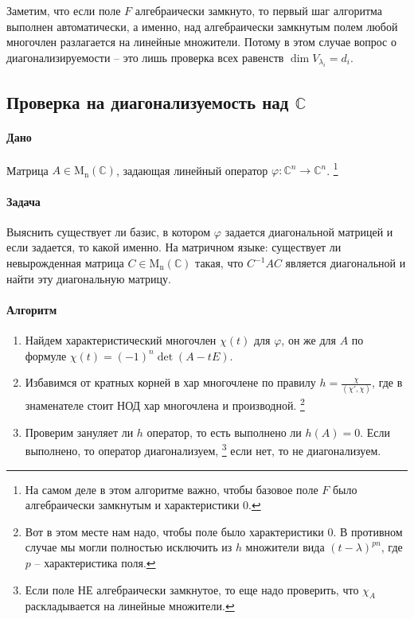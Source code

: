 \documentclass{article}
\newcommand{\Matrix}[2]{\operatorname{\mathrm{M}_{#2}}(#1)}
\begin{document}
Заметим, что если поле $F$ алгебраически замкнуто, то первый шаг алгоритма выполнен автоматически, а именно, над алгебраически замкнутым полем любой многочлен разлагается на линейные множители.
Потому в этом случае вопрос о диагонализируемости -- это лишь проверка всех равенств $\dim V_{\lambda_i} = d_i$.


\subsection{Проверка на диагонализуемость над $\mathbb C$}

\paragraph{Дано}

Матрица $A\in \Matrix{\mathbb C}{n}$, задающая линейный оператор $\varphi \colon \mathbb C^n\to\mathbb C^n$.%
\footnote{На самом деле в этом алгоритме важно, чтобы базовое поле $F$ было алгебраически замкнутым и характеристики $0$.}

\paragraph{Задача}

Выяснить существует ли базис, в котором $\varphi$ задается диагональной матрицей и если задается, то какой именно.
На матричном языке: существует ли невырожденная матрица $C\in \Matrix{\mathbb C}{n}$ такая, что $C^{-1}AC$ является диагональной и найти эту диагональную матрицу.

\paragraph{Алгоритм}

\begin{enumerate}
\item Найдем характеристический многочлен $\chi(t)$ для $\varphi$, он же для $A$ по формуле $\chi(t) = (-1)^n\det(A-t E)$.

\item Избавимся от кратных корней в хар многочлене по правилу $h = \frac{\chi}{(\chi', \chi)}$, где в 
знаменателе стоит НОД хар многочлена и производной.%
\footnote{Вот в этом месте нам надо, чтобы поле было характеристики $0$. В противном случае мы могли полностью исключить из $h$ множители вида $(t-\lambda)^{pn}$, где $p$ -- характеристика поля.}

\item Проверим зануляет ли $h$ оператор, то есть выполнено ли $h(A) = 0$. Если выполнено, то оператор диагонализуем,%
\footnote{Если поле НЕ алгебраически замкнутое, то еще надо проверить, что $\chi_A$ раскладывается на линейные множители.}
если нет, то не диагонализуем.
\end{enumerate}
\end{document}
